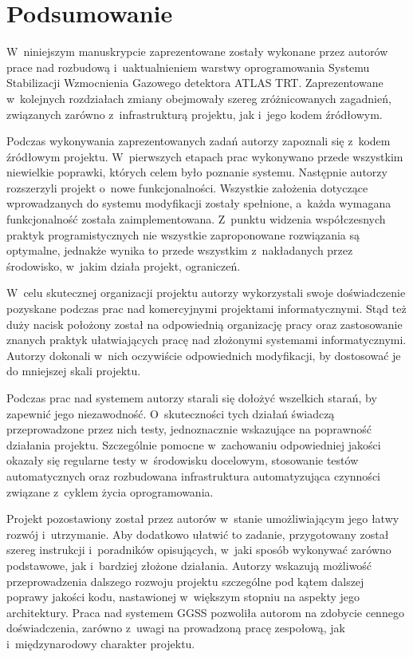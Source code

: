 \chapter{Podsumowanie}
\label{cha:summary}

W~niniejszym manuskrypcie zaprezentowane zostały wykonane przez autorów prace nad rozbudową i~uaktualnieniem warstwy oprogramowania Systemu Stabilizacji Wzmocnienia Gazowego detektora ATLAS TRT. Zaprezentowane w~kolejnych rozdziałach zmiany obejmowały szereg zróżnicowanych zagadnień, związanych zarówno z~infrastrukturą projektu, jak i~jego kodem źródłowym. 

Podczas wykonywania zaprezentowanych zadań autorzy zapoznali się z~kodem źródłowym projektu. W~pierwszych etapach prac wykonywano przede wszystkim niewielkie poprawki, których celem było poznanie systemu. Następnie autorzy rozszerzyli projekt o~nowe funkcjonalności. Wszystkie założenia dotyczące wprowadzanych do systemu modyfikacji zostały spełnione, a~każda wymagana funkcjonalność została zaimplementowana. Z~punktu widzenia współczesnych praktyk programistycznych nie wszystkie zaproponowane rozwiązania są optymalne, jednakże wynika to przede wszystkim z~nakładanych przez środowisko, w~jakim działa projekt, ograniczeń.

W~celu skutecznej organizacji projektu autorzy wykorzystali swoje doświadczenie pozyskane podczas prac nad komercyjnymi projektami informatycznymi. Stąd też duży nacisk położony został na odpowiednią organizację pracy oraz zastosowanie znanych praktyk ułatwiających pracę nad złożonymi systemami informatycznymi. Autorzy dokonali w~nich oczywiście odpowiednich modyfikacji, by dostosować je do mniejszej skali projektu.

Podczas prac nad systemem autorzy starali się dołożyć wszelkich starań, by zapewnić jego niezawodność. O~skuteczności tych działań świadczą przeprowadzone przez nich testy, jednoznacznie wskazujące na poprawność działania projektu. Szczególnie pomocne w~zachowaniu odpowiedniej jakości okazały się regularne testy w~środowisku docelowym, stosowanie testów automatycznych oraz rozbudowana infrastruktura automatyzująca czynności związane z~cyklem życia oprogramowania.

Projekt pozostawiony został przez autorów w~stanie umożliwiającym jego łatwy rozwój i~utrzymanie. Aby dodatkowo ułatwić to zadanie, przygotowany został szereg instrukcji i~poradników opisujących, w~jaki sposób wykonywać zarówno podstawowe, jak i~bardziej złożone działania. Autorzy wskazują możliwość przeprowadzenia dalszego rozwoju projektu szczególne pod kątem dalszej poprawy jakości kodu, nastawionej w~większym stopniu na aspekty jego architektury. Praca nad systemem GGSS pozwoliła autorom na zdobycie cennego doświadczenia, zarówno z~uwagi na prowadzoną pracę zespołową, jak i~międzynarodowy charakter projektu.
